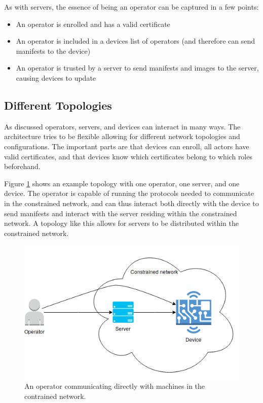 \documentclass[0-thesis.tex]{subfiles}
\begin{document}
As with servers, the essence of being an operator can be captured in a few points:

\begin{itemize}
    \item An operator is enrolled and has a valid certificate
    \item An operator is included in a devices list of operators (and therefore can send
            manifests to the device)
    \item An operator is trusted by a server to send manifests and images to the server,
            causing devices to update
\end{itemize}

\subsection{Different Topologies}
\label{ssec:different-topologies}
As discussed operators, servers, and devices can interact in many ways. The architecture
tries to be flexible allowing for different network topologies and configurations. The
important parts are that devices can enroll, all actors have valid certificates, and that
devices know which certificates belong to which roles beforehand. 

Figure \ref{fig:operator-direct} shows an example topology with one operator, one server,
and one device. The operator is capable of running the protocols needed to communicate in
the constrained network, and can thus interact both directly with the device to send
manifests and interact with the server residing within the constrained network. A topology
like this allows for servers to be distributed within the constrained network.

\begin{figure}
    \caption{An operator communicating directly with machines in the contrained network.}
    \label{fig:operator-direct}
    \includegraphics[scale=0.8]{images/operator-direct.png}
\end{figure}
\end{document}
